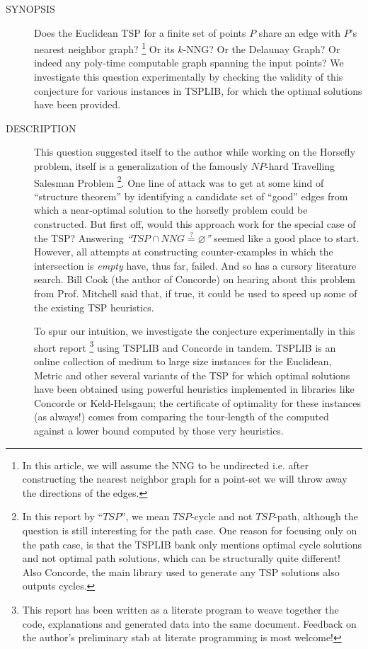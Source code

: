 \vspace{5mm}
\begin{description}
  \item[SYNOPSIS] Does the Euclidean TSP for a finite set of points $P$ share an edge with $P$'s nearest neighbor graph? \footnote{In this article, we will assume the NNG to be undirected i.e. after constructing the nearest neighbor graph for a point-set we will throw away the directions of the edges.}
     Or its $k$-NNG? Or the Delaunay Graph? 
     Or indeed any poly-time computable graph spanning the input points? We investigate
     this question experimentally by checking the validity of this conjecture for  
     various instances  in TSPLIB, for which the optimal solutions
     have been provided. 
                   
  \item[DESCRIPTION] This question suggested itself to the author while working on the Horsefly problem, itself is 
     a generalization of the famously $NP$-hard Travelling Salesman Problem \footnote{In this report by ``$TSP$'', we mean $TSP$-cycle and not $TSP$-path, although the question is still interesting for the path case. One reason for focusing only on the path case, is that the TSPLIB bank only mentions optimal cycle solutions and not optimal path solutions, which can be structurally quite different! Also Concorde, the main library used to generate any TSP solutions also outputs cycles.}. 
     One line of attack was to get at some kind of ``structure theorem'' by identifying  a candidate set of ``good'' edges from which a near-optimal solution to the 
     horsefly problem could be constructed. But first off, would this approach work for the special case of the  TSP?  Answering
     \textit{``$TSP \cap NNG \stackrel{?}{=} \varnothing$''} seemed like a good place to start.  However, all attempts  
     at constructing counter-examples in which the intersection is \textit{empty} have, thus far, failed. And so has a cursory 
     literature search. Bill Cook (the author of Concorde) on hearing about this problem from Prof. Mitchell said that, if true,
     it could be used to speed up some of the existing TSP heuristics. 

     To spur our intuition,  we investigate the conjecture experimentally in this short report 
     \footnote{This report has been written as a literate program to weave together the code, explanations and generated data into the same document. Feedback on the author's preliminary stab at literate programming is most welcome!}
     using TSPLIB and Concorde in tandem. TSPLIB is an online collection of medium to large size instances for the Euclidean, Metric and other several variants of the TSP 
     for which optimal solutions have been obtained using powerful heuristics implemented in libraries like Concorde or Keld-Helsgaun;
     the certificate of optimality for these instances (as always!) comes from comparing the tour-length of the computed against 
     a lower bound computed by those very heuristics. 


\end{description}
